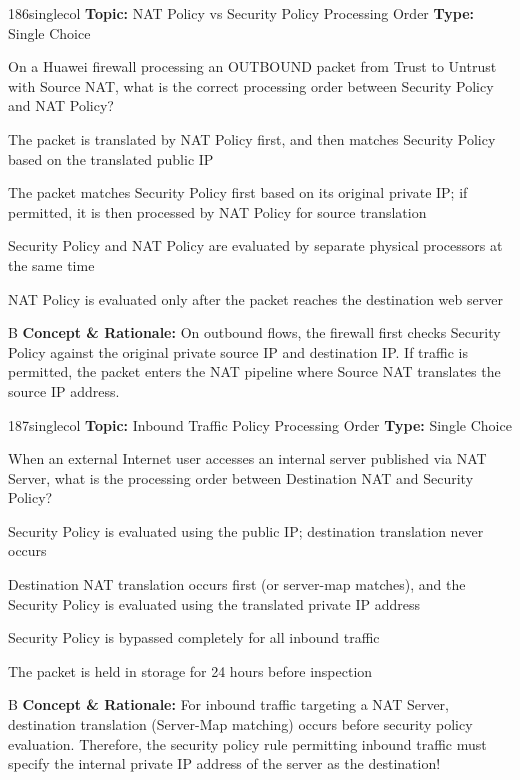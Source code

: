 \begin{qcard}{186}{singlecol}
\textcolor{darkslate!75}{\small\textbf{Topic:} NAT Policy vs Security Policy Processing Order \hfill \textbf{Type:} Single Choice}\vspace{0.4em}\par
On a Huawei firewall processing an OUTBOUND packet from Trust to Untrust with Source NAT, what is the correct processing order between Security Policy and NAT Policy?
\begin{qoptions}
\item The packet is translated by NAT Policy first, and then matches Security Policy based on the translated public IP
\item The packet matches Security Policy first based on its original private IP; if permitted, it is then processed by NAT Policy for source translation
\item Security Policy and NAT Policy are evaluated by separate physical processors at the same time
\item NAT Policy is evaluated only after the packet reaches the destination web server
\end{qoptions}
\end{qcard}
\nopagebreak
\begin{explainbox}{B}
\textbf{Concept \& Rationale:} On outbound flows, the firewall first checks Security Policy against the original private source IP and destination IP. If traffic is permitted, the packet enters the NAT pipeline where Source NAT translates the source IP address.
\end{explainbox}

\begin{qcard}{187}{singlecol}
\textcolor{darkslate!75}{\small\textbf{Topic:} Inbound Traffic Policy Processing Order \hfill \textbf{Type:} Single Choice}\vspace{0.4em}\par
When an external Internet user accesses an internal server published via NAT Server, what is the processing order between Destination NAT and Security Policy?
\begin{qoptions}
\item Security Policy is evaluated using the public IP; destination translation never occurs
\item Destination NAT translation occurs first (or server-map matches), and the Security Policy is evaluated using the translated private IP address
\item Security Policy is bypassed completely for all inbound traffic
\item The packet is held in storage for 24 hours before inspection
\end{qoptions}
\end{qcard}
\nopagebreak
\begin{explainbox}{B}
\textbf{Concept \& Rationale:} For inbound traffic targeting a NAT Server, destination translation (Server-Map matching) occurs before security policy evaluation. Therefore, the security policy rule permitting inbound traffic must specify the internal private IP address of the server as the destination!
\end{explainbox}

